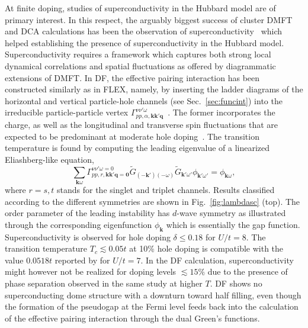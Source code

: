 \documentclass[rmp,aps,reprint,amsmath,amssymb,superscriptaddress,showpacs,nofootinbib]{revtex4-1}
\newcommand{\vc}[1]{\ensuremath{\mathbf{#1}}}
\begin{document}
At finite doping, studies of superconductivity in the Hubbard model are of primary interest. In this respect, the arguably biggest success of  cluster DMFT and DCA calculations has been the observation of superconductivity~\cite{Lichtenstein2000,Maier2005a,Capone2006,Haule2007b,Sordi2012,Gull2013} which helped establishing the presence of superconductivity in the Hubbard model. Superconductivity requires a framework which captures both strong local dynamical correlations and spatial fluctuations as offered by diagrammatic extensions of DMFT. In DF, the effective pairing interaction has been constructed similarly as in FLEX, namely, by inserting the ladder diagrams of the horizontal and vertical  particle-hole channels (see Sec.~\ref{sec:funcint}) into the irreducible particle-particle vertex $\Gamma^{\nu\nu'\omega}_{pp,\alpha,\vc{k}\vc{k}'\vc{q}}$~\cite{Hafermann2009a,Otsuki2014}. The former incorporates the charge, as well as the longitudinal and transverse spin fluctuations that are expected to be predominant at moderate hole doping~\cite{Gunnarsson2015,Gunnarsson2016}. The transition temperature is found by computing the leading eigenvalue of a linearized Eliashberg-like equation,
\begin{equation}
\label{ref_to_eqn}
  \sum_{\vc{k}\omega}\Gamma^{\nu\nu'\omega=0}_{pp,r,\vc{k}\vc{k}'\vc{q}=\vc{0}}\widetilde{G}_{(-\vc{k}')(-\omega)}\widetilde{G}_{\vc{k}'\omega'}\phi_{\vc{k}'\omega'} = \phi_{\vc{k}\omega},
\end{equation}
where $r=s,t$ stands for the singlet and triplet channels. Results classified according to the different symmetries are shown in Fig.~\ref{fig:lambdasc} (top). The order parameter of the leading instability has $d$-wave symmetry as illustrated through the corresponding eigenfunction $\phi_{\vc{k}}$ which is essentially the gap function. Superconductivity is observed for hole doping $\delta\leq0.18$ for $U/t=8$. The transition temperature $T_{c}\lesssim 0.05 t$ at 10\% hole doping is compatible with the value $0.0518 t$ reported by  for $U/t=7$. In the DF calculation, superconductivity might however not be realized for doping levels $\lesssim 15\%$ due to the presence of phase separation observed in the same study at higher $T$. DF shows no superconducting dome structure with a downturn toward half filling, even though the formation of the pseudogap at the Fermi level feeds back into the calculation of the effective pairing interaction through the dual Green’s functions.
\end{document}
